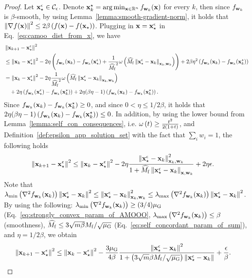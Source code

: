 \begin{proof}
Let $\xse \in \mC_\epsilon$. Denote $\x_k^\star = \argmin_{\x\in\reals^n} f_{\w_k}(\x)$ for every $k$, then since $f_{\w_k}$ is $\beta$-smooth, by using Lemma~\ref{lemma:smooth-gradient-norm}, it holds that $\enorm{\nabla f (\x)}^2 \leq 2\beta \brac{f(\x) - f(\x_\star)}$. Plugging in $\x = \xse$ in Eq.~\eqref{eq:camoo_dist_from_x}, we have 
\begin{align*}
    &\enorm{\x_{k+1}-\xse}^2 \\
    &\leq \enorm{\x_k-\xse}^2 - 2\eta\brac{f_{\w_k}(\x_k) -f_{\w_k}(\xse) + \frac{1}{\widehat{M_{\mathrm{f}}}^2} \omega\brac{\widehat{M_{\mathrm{f}}}\enorm{\xse - \x_k}_{\x_k,\w_k} }} + 2 \beta \eta^2 \brac{f_{\w_k}(\x_k) -f_{\w_k}(\x_k^\star)} \\
    & =  \enorm{\x_k-\xse}^2 - 2\eta \frac{1}{\widehat{M_{\mathrm{f}}}^2} \omega\brac{\widehat{M_{\mathrm{f}}}\enorm{\xse - \x_k}_{\x_k,\w_k} } \\
    &\quad + 2\eta \brac{f_{\w_k}(\xse) -f_{\w_k}(\x_k^\star)} + 2\eta (\beta \eta - 1) \brac{f_{\w_k}(\x_k) -f_{\w_k}(\x_k^\star)}.
\end{align*}
Since $f_{\w_k}(\x_k) -f_{\w_k}(\x_k^\star)\geq 0$, and since $0 < \eta \leq 1/2\beta$, it holds that $2\eta (\beta \eta - 1) \brac{f_{\w_k}(\x_k) -f_{\w_k}(\x_k^\star)} \leq 0$. In addition, by using the lower bound from Lemma~\ref{lemma:self_con_consequences}, i.e. $\omega\brac{t} \geq \frac{t^2}{2\brac{1+t}}$, and Definition~\ref{def:epsilon_app_solution_set} with the fact that $\sum_i w_i = 1$, the following holds
\begin{align*}
    \enorm{\x_{k+1}-\xse}^2 &\leq \enorm{\x_k-\xse}^2 -2\eta \frac{\enorm{\xse - \x_k}_{\x_k,\w_k}^2}{1+\widehat{M_{\mathrm{f}}}\enorm{\xse - \x_k}_{\x,\w_k}} + 2\eta\epsilon.
\end{align*}
Note that $\lambda_{\min}\brac{\nabla^2 f_{\w_k}(\x_k)} \enorm{\xse - \x_k}^2 \leq \enorm{\xse - \x_k}_{\x_k,\w_k}^2 \leq \lambda_{\max}\brac{\nabla^2 f_{\w_k}(\x_k)} \enorm{\xse - \x_k}^2$. By using the following: $\lambda_{\min}\brac{\nabla^2 f_{\w_k}(\x_k)} \geq (3/4)\muglobal$ (Eq.~\eqref{eq:strongly_convex_param_of_AMOOO}, $\lambda_{\max}\brac{\nabla^2 f_{\w_k}(\x_k)} \leq \beta$ (smoothness), $\widehat{M_{\mathrm{f}}} \leq 3\sqrt{m\beta}M_{\mathrm{f}} /\sqrt{\muglobal}$ (Eq.~\eqref{eq:self_concordant_param_of_sum}), and $\eta = 1/2\beta$, we obtain
\begin{align*}
    \enorm{\x_{k+1}-\xse}^2 &\leq \enorm{\x_k-\xse}^2 -\frac{3 \muglobal}{4 \beta} \frac{\enorm{\xse - \x_k}^2}{1+\brac{3\sqrt{m}\beta M_{\mathrm{f}}/\sqrt{\muglobal}}\enorm{\xse - \x_k}} + \frac{\epsilon}{\beta}.

\end{align*}
\end{proof}

